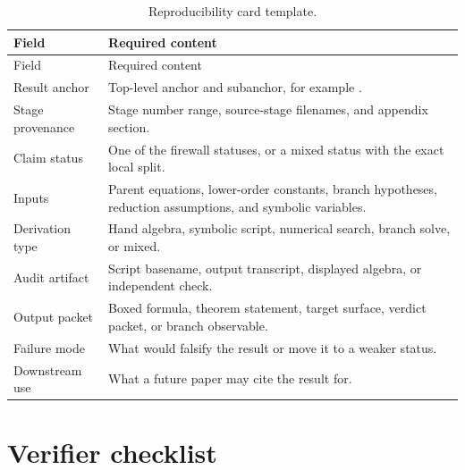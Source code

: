 \begin{longtable}{@{}L{0.23\textwidth}L{0.67\textwidth}@{}}
\caption{Reproducibility card template.}\label{tab:reproducibility-card-template}\\
\toprule
Field & Required content \\
\midrule
\endfirsthead
\toprule
Field & Required content \\
\midrule
\endhead
Result anchor & Top-level anchor and subanchor, for example . \\
Stage provenance & Stage number range, source-stage filenames, and appendix section. \\
Claim status & One of the firewall statuses, or a mixed status with the exact local split. \\
Inputs & Parent equations, lower-order constants, branch hypotheses, reduction assumptions, and symbolic variables. \\
Derivation type & Hand algebra, symbolic script, numerical search, branch solve, or mixed. \\
Audit artifact & Script basename, output transcript, displayed algebra, or independent check. \\
Output packet & Boxed formula, theorem statement, target surface, verdict packet, or branch observable. \\
Failure mode & What would falsify the result or move it to a weaker status. \\
Downstream use & What a future paper may cite the result for. \\
\bottomrule
\end{longtable}

\section{Verifier checklist}
\label{sec:verifier-checklist}

